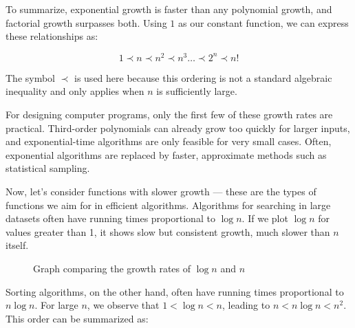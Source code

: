 To summarize, exponential growth is faster than any polynomial growth, and factorial growth surpasses both. Using \(1\) as our constant function, we can express these relationships as:

\[
1 \prec n \prec n^2 \prec n^3 \ldots \prec 2^n \prec n!
\]

The symbol \( \prec \) is used here because this ordering is not a standard algebraic inequality and only applies when \( n \) is sufficiently large.

For designing computer programs, only the first few of these growth rates are practical. Third-order polynomials can already grow too quickly for larger inputs, and exponential-time algorithms are only feasible for very small cases. Often, exponential algorithms are replaced by faster, approximate methods such as statistical sampling.

Now, let's consider functions with slower growth — these are the types of functions we aim for in efficient algorithms. Algorithms for searching in large datasets often have running times proportional to \( \log n \). If we plot \( \log n \) for values greater than 1, it shows slow but consistent growth, much slower than \( n \) itself.

\begin{figure}[htbp]
    \centering
    \caption{Graph comparing the growth rates of $\log n$ and $n$}
\end{figure}

Sorting algorithms, on the other hand, often have running times proportional to \( n \log n \). For large \( n \), we observe that \( 1 < \log n < n \), leading to \( n < n \log n < n^2 \). This order can be summarized as:

